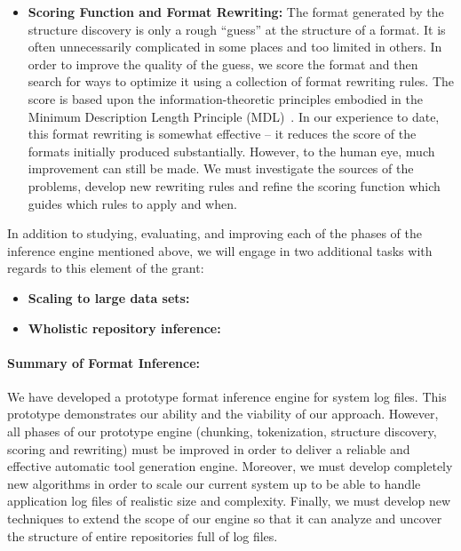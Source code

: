 \begin{itemize}
\item {\bf Scoring Function and Format Rewriting:}
The format generated by the structure discovery is only a rough ``guess''
at the structure of a format.  It is often unnecessarily complicated
in some places and too limited in others.  In order to improve the 
quality of the guess, we score the format and then search for ways
to optimize it using a collection of format rewriting rules.  The
score is based upon the information-theoretic principles embodied in
the Minimum Description Length Principle (MDL)~\cite{mdl}.  In our
experience to date, this format rewriting is somewhat effective --
it reduces the score of the formats initially produced substantially.
However, to the human eye, much improvement can still be made.  We must
investigate the sources of the problems, develop new rewriting rules
and refine the scoring function which guides which rules to apply and
when. 
\end{itemize}

In addition to studying, evaluating, and improving each of the phases
of the inference engine mentioned above, we will engage in two additional
tasks with regards to this element of the grant:

\begin{itemize}
\item {\bf Scaling to large data sets:}
\item {\bf Wholistic repository inference:}
\end{itemize}

\paragraph*{Summary of Format Inference:}  
We have developed a prototype
format inference engine for system log files.  This prototype demonstrates
our ability and the viability of our approach.  However, all phases of
our prototype engine (chunking, tokenization, structure discovery,
scoring and rewriting) must be improved in order to deliver a reliable and
effective automatic tool generation engine.  Moreover, we must develop
completely new algorithms in order to scale our current system up to 
be able to handle application log files of realistic size and complexity.
Finally, we must develop new techniques to extend the scope of our engine
so that it can analyze and uncover the structure
of entire repositories full of log files.